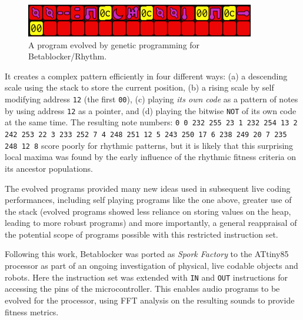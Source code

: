\documentclass[letterpaper, 12pt]{article}
\begin{document}
\begin{figure}[H]
	\centering
		\includegraphics[width=10cm]{evolved}
	\caption{A program evolved by genetic programming for Betablocker/Rhythm.}
	\label{fig:evolved}
\end{figure}

It creates a complex pattern efficiently in four different ways:
 (a) a descending scale using the stack to store the current position,
 (b) a rising scale by self modifying address \texttt{12} (the first \texttt{00}),
 (c) playing \emph{its own code} as a pattern of notes by using address \texttt{12} as a pointer, and
 (d) playing the bitwise \texttt{NOT} of its own code at the same time.
%
%
The resulting note numbers: \texttt{0 0 232 255 23 1 232 254 13 2 242 253 22 3 233 252 7 4 248 251 12 5 243 250 17 6 238 249 20 7 235 248 12 8} score poorly for rhythmic patterns, but it is likely that this surprising local maxima was found by the early influence of the rhythmic fitness criteria on its ancestor populations.

The evolved programs provided many new ideas used in subsequent live coding performances,  including self playing programs like the one above, greater use of the stack (evolved programs showed less reliance on storing values on the heap, leading to more robust programs) and more importantly, a general reappraisal of the potential scope of programs possible with this restricted instruction set.

Following this work, Betablocker was ported as \emph{Spork Factory} to the ATtiny85 processor as part of an ongoing investigation of physical, live codable objects and robots.
Here the instruction set was extended with \texttt{IN} and \texttt{OUT} instructions for accessing the pins of the microcontroller.
This enables audio programs to be evolved for the processor, using FFT analysis on the resulting sounds to provide fitness metrics.
\parskip 18pt
\end{document}
